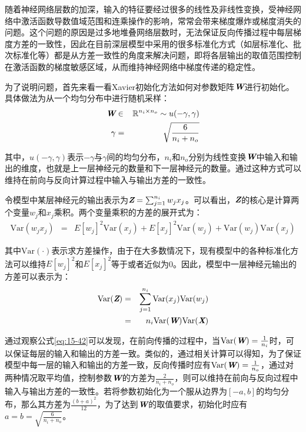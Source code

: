 \parinterval 随着神经网络层数的加深，输入的特征要经过很多的线性及非线性变换，受神经网络中激活函数导数值域范围和连乘操作的影响，常常会带来梯度爆炸或梯度消失的问题。这个问题的原因是过多地堆叠网络层数时，无法保证反向传播过程中每层梯度方差的一致性，因此在目前深层模型中采用的很多标准化方式（如层标准化、批次标准化等）都是从方差一致性的角度来解决问题，即将各层输出的取值范围控制在激活函数的梯度敏感区域，从而维持神经网络中梯度传递的稳定性。

\parinterval 为了说明问题，首先来看一看Xavier初始化方法如何对参数矩阵$\textbf{\em W}$进行初始化。具体做法为从一个均匀分布中进行随机采样：
\begin{eqnarray}
\textbf{\em W} & \in & \mathbb{R}^{n_i\times n_o} \sim u(-\gamma,\gamma) \\
\gamma     & = & \sqrt{\frac{6}{n_i + n_o}}
\label{eq:15-40}
\end{eqnarray}

\noindent 其中，$u(-\gamma,\gamma)$表示$-\gamma$与$\gamma$间的均匀分布，$n_i$和$n_o$分别为线性变换$\textbf{\em W}$中输入和输出的维度，也就是上一层神经元的数量和下一层神经元的数量。通过这种方式可以维持在前向与反向计算过程中输入与输出方差的一致性。

\parinterval 令模型中某层神经元的输出表示为$\textbf{\em Z}=\sum_{j=1}^{n_i}{w_j x_j}$。可以看出，$\textbf{\em Z}$的核心是计算两个变量$w_j$和$x_j$乘积。两个变量乘积的方差的展开式为：
\begin{eqnarray}
\textrm{Var}(w_j x_j) &=& E[w_j]^2 \textrm{Var}(x_j) + E[x_j]^2 \textrm{Var}(w_j) + \textrm{Var}(w_j)\textrm{Var}(x_j)
\label{eq:15-41}
\end{eqnarray}

\parinterval 其中$\textrm{Var}(\cdot)$表示求方差操作，由于在大多数情况下，现有模型中的各种标准化方法可以维持$E[w_j]^2$和$E[x_j]^2$等于或者近似为0。因此，模型中一层神经元输出的方差可以表示为：
\begin{eqnarray}
\textrm{Var}(\textbf{\em Z}) &=& \sum_{j=1}^{n_i}{\textrm{Var}(x_j) \textrm{Var}(w_j)} \nonumber \\
&=& {n_i}\textrm{Var}(\textbf{\em W})\textrm{Var}(\textbf{\em X})
\label{eq:15-42}
\end{eqnarray}

\parinterval 通过观察公式\eqref{eq:15-42}可以发现，在前向传播的过程中，当$\textrm{Var}(\textbf{\em W})=\frac{1}{n_i}$时，可以保证每层的输入和输出的方差一致。类似的，通过相关计算可以得知，为了保证模型中每一层的输入和输出的方差一致，反向传播时应有$\textrm{Var}(\textbf{\em W})=\frac{1}{n_o}$，通过对两种情况取平均值，控制参数$\textbf{\em W}$的方差为$\frac{2}{n_i+n_o}$，则可以维持在前向与反向过程中输入与输出方差的一致性。若将参数初始化为一个服从边界为$[-a,b]$的均匀分布，那么其方差为$\frac{{(b+a)}^2}{12}$，为了达到$\textbf{\em W}$的取值要求，初始化时应有$a=b=\sqrt{\frac{6}{n_i+n_o}}$。

